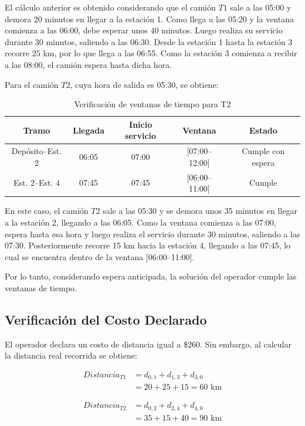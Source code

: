 El cálculo anterior es obtenido considerando que el camión $T1$ sale a las 05:00 y demora 20 minutos en llegar a la estación 1. Como llega a las 05:20 y la ventana comienza a las 06:00, debe esperar unos 40 minutos. Luego realiza su servicio durante 30 minutos, saliendo a las 06:30. Desde la estación 1 hasta la estación 3 recorre 25 km, por lo que llega a las 06:55. Como la estación 3 comienza a recibir a las 08:00, el camión espera hasta dicha hora.

Para el camión $T2$, cuya hora de salida es 05:30, se obtiene:

\begin{table}[H]
\centering
\caption{Verificación de ventanas de tiempo para T2}
\begin{tabular}{ccccc}
\toprule
Tramo & Llegada & Inicio servicio & Ventana & Estado \\
\midrule
Depósito--Est. 2 & 06:05 & 07:00 & [07:00--12:00] & Cumple con espera \\
Est. 2--Est. 4 & 07:45 & 07:45 & [06:00--11:00] & Cumple \\
\bottomrule
\end{tabular}
\end{table}

En este caso, el camión $T2$ sale a las 05:30 y se demora unos 35 minutos en llegar a la estación 2, llegando a las 06:05. Como la ventana comienza a las 07:00, espera hasta esa hora y luego realiza el servicio durante 30 minutos, saliendo a las 07:30. Posteriormente recorre 15 km hacia la estación 4, llegando a las 07:45, lo cual se encuentra dentro de la ventana [06:00--11:00].

Por lo tanto, considerando espera anticipada, la solución del operador cumple las ventanas de tiempo.

\subsection{Verificación del Costo Declarado}

El operador declara un costo de distancia igual a \$260. Sin embargo, al calcular la distancia real recorrida se obtiene:

\begin{align*}
Distancia_{T1} &= d_{0,1} + d_{1,3} + d_{3,0} \\
&= 20 + 25 + 15 = 60 \text{ km}
\end{align*}

\begin{align*}
Distancia_{T2} &= d_{0,2} + d_{2,4} + d_{4,0} \\
&= 35 + 15 + 40 = 90 \text{ km}
\end{align*}

